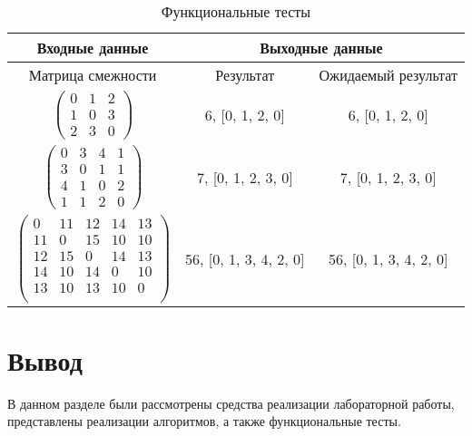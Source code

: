 \begin{table}[h]
	\begin{center}
        \captionsetup{justification=raggedright,singlelinecheck=off}
		\caption{\label{tbl:functional_test} Функциональные тесты}
		\begin{tabular}{|c|c|c|}
            \hline
        	Входные данные& \multicolumn{2}{c|}{Выходные данные}
        	\\ \hline
        	Матрица смежности & Результат & Ожидаемый результат 
        	\\ \hline
        	$\begin{pmatrix}
        		0 & 1 & 2\\
        		1 & 0 & 3\\
        		2 & 3 & 0
        	\end{pmatrix}$ & 6, [0, 1, 2, 0] & 6, [0, 1, 2, 0]
        	\\ \hline
        	$\begin{pmatrix}
        		0 & 3 & 4 & 1\\
        		3 & 0 & 1 & 1\\
        		4 & 1 & 0 & 2\\
        		1 & 1 & 2 & 0
        	\end{pmatrix}$ & 7, [0, 1, 2, 3, 0] & 7, [0, 1, 2, 3, 0]
        	\\ \hline
        	$\begin{pmatrix}
        		0 & 11 & 12 & 14 & 13\\
        		11 & 0 & 15 & 10 & 10\\
        		12 & 15 & 0 & 14 & 13\\
        		14 & 10 & 14 & 0 & 10\\
        		13 & 10 & 13 & 10 & 0\\
        	\end{pmatrix}$ & 56, [0, 1, 3, 4, 2, 0] & 56, [0, 1, 3, 4, 2, 0]
        	\\ \hline
		\end{tabular}
	\end{center}
\end{table}

\section*{Вывод}
В данном разделе были рассмотрены средства реализации лабораторной работы, представлены реализации алгоритмов, а также функциональные тесты.